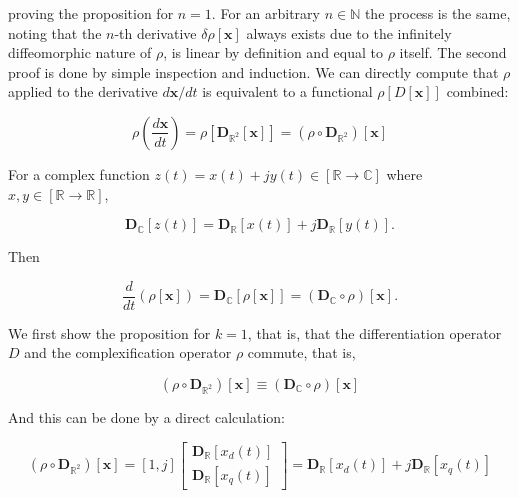 	\noindent proving the proposition for $n=1$. For an arbitrary $n\in\mathbb{N}$ the process is the same, noting that the $n$-th derivative $\delta\rho\left[\mathbf{x}\right]$ always exists due to the infinitely diffeomorphic nature of $\rho$, is linear by definition and equal to $\rho$ itself. The second proof is done by simple inspection and induction. We can directly compute that $\rho$ applied to the derivative $d\mathbf{x}/dt$ is equivalent to a functional $\rho\left[D\left[\mathbf{x}\right]\right]$ combined:

\begin{equation} \rho\left(\dfrac{d\mathbf{x}}{dt}\right) = \rho\left[\mathbf{D}_{\mathbb{R}^2}\left[\mathbf{x}\right]\right] = \left(\rho\circ \mathbf{D}_{\mathbb{R}^2}\right)\left[\mathbf{x}\right]\end{equation}

	For a complex function $z(t) = x(t) + jy(t)\in\left[\mathbb{R}\to\mathbb{C}\right]$ where $x,y\in\left[\mathbb{R}\to\mathbb{R}\right]$, 

\begin{equation} \mathbf{D}_{\mathbb{C}}\left[z(t)\right] = \mathbf{D}_{\mathbb{R}}\left[x(t)\right] + j\mathbf{D}_{\mathbb{R}}\left[y(t)\right] .\end{equation}

	Then

\begin{equation} \dfrac{d}{dt}\left(\rho\left[\mathbf{x}\right]\right) = \mathbf{D}_{\mathbb{C}}\left[\rho\left[\mathbf{x}\right]\right] = \left(\mathbf{D}_{\mathbb{C}}\circ \rho\right)\left[\mathbf{x}\right] .\end{equation}

	We first show the proposition for $k=1$, that is, that the differentiation operator $D$ and the complexification operator $\rho$ commute, that is,

\begin{equation} \left(\rho\circ \mathbf{D}_{\mathbb{R}^2}\right)\left[\mathbf{x}\right]\equiv \left(\mathbf{D}_{\mathbb{C}}\circ \rho\right)\left[\mathbf{x}\right]\end{equation}

	And this can be done by a direct calculation:

\begin{equation} \left(\rho\circ \mathbf{D}_{\mathbb{R}^2}\right)\left[\mathbf{x}\right] = \left[1,j\right]\left[\begin{array}{c} \mathbf{D}_{\mathbb{R}}\left[x_d(t)\right] \\[5mm] \mathbf{D}_{\mathbb{R}}\left[x_q(t)\right] \end{array}\right] = \mathbf{D}_{\mathbb{R}}\left[x_d(t)\right] + j\mathbf{D}_{\mathbb{R}}\left[x_q(t)\right]\end{equation}

